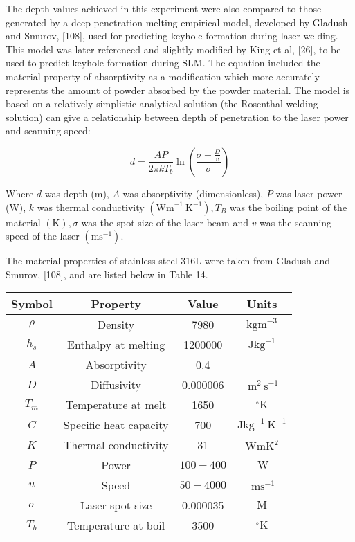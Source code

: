 \documentclass[10pt]{article}
\begin{document}
The depth values achieved in this experiment were also compared to those generated by a deep penetration melting empirical model, developed by Gladush and Smurov, [108], used for predicting keyhole formation during laser welding. This model was later referenced and slightly modified by King et al, [26], to be used to predict keyhole formation during SLM. The equation included the material property of absorptivity as a modification which more accurately represents the amount of powder absorbed by the powder material. The model is based on a relatively simplistic analytical solution (the Rosenthal welding solution) can give a relationship between depth of penetration to the laser power and scanning speed:


\begin{equation*}
d=\frac{A P}{2 \pi k T_{b}} \ln \left(\frac{\sigma+\frac{D}{v}}{\sigma}\right) \tag{9}
\end{equation*}


Where $d$ was depth (m), $A$ was absorptivity (dimensionless), $P$ was laser power (W), $k$ was thermal conductivity $\left(\mathrm{Wm}^{-1} \mathrm{~K}^{-1}\right), T_{B}$ was the boiling point of the material $(\mathrm{K}), \sigma$ was the spot size of the laser beam and $v$ was the scanning speed of the laser $\left(\mathrm{ms}^{-1}\right)$.

The material properties of stainless steel 316L were taken from Gladush and Smurov, [108], and are listed below in Table 14.

\begin{center}
\begin{tabular}{|c|c|c|c|}
\hline
Symbol & Property & Value & Units \\
\hline
$\rho$ & Density & 7980 & $\mathrm{kgm}^{-3}$ \\
\hline
$h_{s}$ & Enthalpy at melting & 1200000 & $\mathrm{Jkg}^{-1}$ \\
\hline
$A$ & Absorptivity & 0.4 &  \\
\hline
$D$ & Diffusivity & 0.000006 & $\mathrm{~m}^{2} \mathrm{~s}^{-1}$ \\
\hline
$T_{m}$ & Temperature at melt & 1650 & ${ }^{\circ} \mathrm{K}$ \\
\hline
$C$ & Specific heat capacity & 700 & $\mathrm{Jkg}^{-1} \mathrm{~K}^{-1}$ \\
\hline
$K$ & Thermal conductivity & 31 & $\mathrm{WmK}^{2}$ \\
\hline
$P$ & Power & $100-400$ & $\mathrm{~W}$ \\
\hline
$u$ & Speed & $50-4000$ & $\mathrm{~ms}^{-1}$ \\
\hline
$\sigma$ & Laser spot size & 0.000035 & $\mathrm{M}$ \\
\hline
$T_{b}$ & Temperature at boil & 3500 & ${ }^{\circ} \mathrm{K}$ \\
\hline
\end{tabular}
\end{center}
\end{document}
